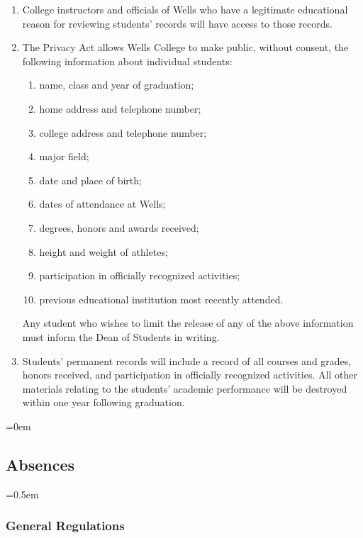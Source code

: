 \documentclass{manual}
\newcommand{\modified}[1]{}
\newcommand{\oldbreak}[1]{}
\let\oldsubsection\subsection
\renewcommand\subsection{\leftskip=0em\oldsubsection}
\let\oldsubsubsection\subsubsection
\renewcommand\subsubsection{\leftskip=0.5em\oldsubsubsection}
\newcommand{\itemLevelA}{\alph*.}
\newcommand{\itemLevelB}{\arabic*)}
\newcommand{\itemRefA}{\alph*}
\newcommand{\itemRefB}{\arabic*}
\begin{document}
\begin{enumerate}[label=\itemLevelA,ref=\itemRefA]
\begin{enumerate}[label=\itemLevelB,ref=\itemRefB]
\item College instructors and officials of Wells who have a legitimate educational reason for reviewing students' records will have access to those records.

\item The Privacy Act allows Wells College to make public, without consent, the following information about individual students:
\begin{enumerate}[label=\alph*)]
\item name, class and year of graduation;
\item home address and telephone number;
\item college address and telephone number;
\item major field;
\item date and place of birth;
\item dates of attendance at Wells;
\item degrees, honors and awards received;
\item height and weight of athletes;
\item participation in officially recognized activities;
\item previous educational institution most recently attended.
\end{enumerate}

Any student who wishes to limit the release of any of the above information must inform the Dean of Students in writing.

\item Students' permanent records will include a record of all courses and grades, honors received, and participation in officially recognized activities. All other materials relating to the students' academic performance will be destroyed within one year following graduation.

\end{enumerate}
\end{enumerate}
\oldbreak{VII-8}



\subsection{Absences}

\subsubsection{General Regulations}\modified{5/14/02}
\end{document}
